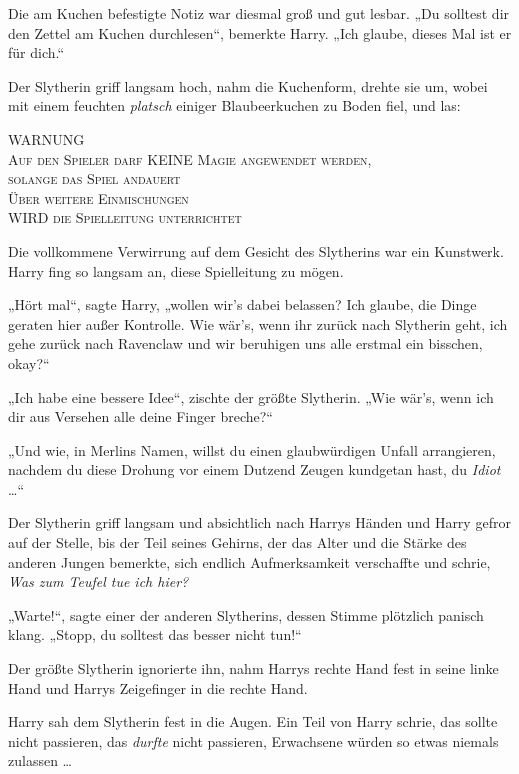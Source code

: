 Die am Kuchen befestigte Notiz war diesmal groß und gut lesbar. „Du solltest dir den Zettel am Kuchen durchlesen“, bemerkte Harry. „Ich glaube, dieses Mal ist er für dich.“ 

Der Slytherin griff langsam hoch, nahm die Kuchenform, drehte sie um, wobei mit einem feuchten \emph{platsch} einiger Blaubeerkuchen zu Boden fiel, und las: \begin{center} \scshape \MakeUppercase{Warnung}\\ Auf den Spieler darf \MakeUppercase{keine} Magie angewendet werden,\\ solange das Spiel andauert\\ Über weitere Einmischungen\\ \MakeUppercase{wird} die Spielleitung unterrichtet \end{center}

Die vollkommene Verwirrung auf dem Gesicht des Slytherins war ein Kunstwerk. Harry fing so langsam an, diese Spielleitung zu mögen. 

„Hört mal“, sagte Harry, „wollen wir's dabei belassen? Ich glaube, die Dinge geraten hier außer Kontrolle. Wie wär's, wenn ihr zurück nach Slytherin geht, ich gehe zurück nach Ravenclaw und wir beruhigen uns alle erstmal ein bisschen, okay?“ 

„Ich habe eine bessere Idee“, zischte der größte Slytherin. „Wie wär's, wenn ich dir aus Versehen alle deine Finger breche?“ 

„Und wie, in Merlins Namen, willst du einen glaubwürdigen Unfall arrangieren, nachdem du diese Drohung vor einem Dutzend Zeugen kundgetan hast, du \emph{Idiot} …“ 

Der Slytherin griff langsam und absichtlich nach Harrys Händen und Harry gefror auf der Stelle, bis der Teil seines Gehirns, der das Alter und die Stärke des anderen Jungen bemerkte, sich endlich Aufmerksamkeit verschaffte und schrie, \emph{Was zum Teufel tue ich hier?} 

„Warte!“, sagte einer der anderen Slytherins, dessen Stimme plötzlich panisch klang. „Stopp, du solltest das besser nicht tun!“ 

Der größte Slytherin ignorierte ihn, nahm Harrys rechte Hand fest in seine linke Hand und Harrys Zeigefinger in die rechte Hand. 

Harry sah dem Slytherin fest in die Augen. Ein Teil von Harry schrie, das sollte nicht passieren, das \emph{durfte} nicht passieren, Erwachsene würden so etwas niemals zulassen … 

